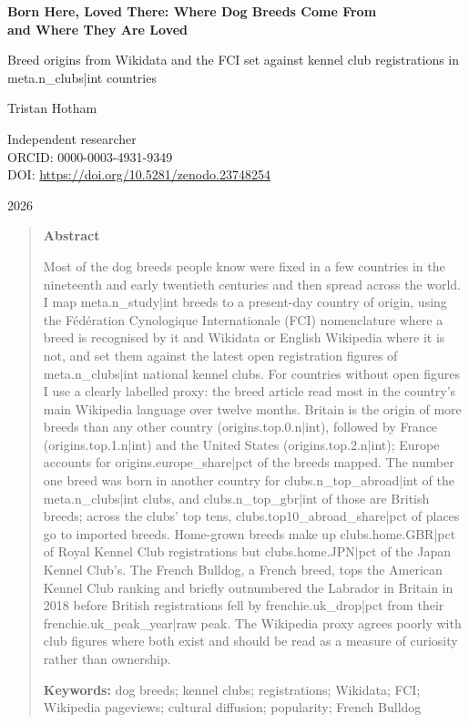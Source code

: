 \documentclass[11pt,a4paper]{article}
\begin{document}
\begin{center}
{\Large\bfseries Born Here, Loved There: Where Dog Breeds Come From\\[2pt] and Where They Are Loved\par}
\vspace{0.4em}
{\large Breed origins from Wikidata and the FCI set against kennel club registrations in {{meta.n_clubs|int}} countries\par}
\vspace{1.2em}
{\large Tristan Hotham\par}
\vspace{0.3em}
{\small Independent researcher\\
ORCID: 0000-0003-4931-9349\\
DOI: \href{https://doi.org/10.5281/zenodo.23748254}{https://doi.org/10.5281/zenodo.23748254}\par}
\vspace{0.8em}
2026
\end{center}

\begin{quote}
\small
\begin{center}\textbf{Abstract}\end{center}
Most of the dog breeds people know were fixed in a few countries in the nineteenth and early twentieth centuries and then spread across the world. I map {{meta.n_study|int}} breeds to a present-day country of origin, using the Fédération Cynologique Internationale (FCI) nomenclature where a breed is recognised by it and Wikidata or English Wikipedia where it is not, and set them against the latest open registration figures of {{meta.n_clubs|int}} national kennel clubs. For countries without open figures I use a clearly labelled proxy: the breed article read most in the country's main Wikipedia language over twelve months. Britain is the origin of more breeds than any other country ({{origins.top.0.n|int}}), followed by France ({{origins.top.1.n|int}}) and the United States ({{origins.top.2.n|int}}); Europe accounts for {{origins.europe_share|pct}} of the breeds mapped. The number one breed was born in another country for {{clubs.n_top_abroad|int}} of the {{meta.n_clubs|int}} clubs, and {{clubs.n_top_gbr|int}} of those are British breeds; across the clubs' top tens, {{clubs.top10_abroad_share|pct}} of places go to imported breeds. Home-grown breeds make up {{clubs.home.GBR|pct}} of Royal Kennel Club registrations but {{clubs.home.JPN|pct}} of the Japan Kennel Club's. The French Bulldog, a French breed, tops the American Kennel Club ranking and briefly outnumbered the Labrador in Britain in 2018 before British registrations fell by {{frenchie.uk_drop|pct}} from their {{frenchie.uk_peak_year|raw}} peak. The Wikipedia proxy agrees poorly with club figures where both exist and should be read as a measure of curiosity rather than ownership.

\textbf{Keywords:} dog breeds; kennel clubs; registrations; Wikidata; FCI; Wikipedia pageviews; cultural diffusion; popularity; French Bulldog
\end{quote}
\end{document}
